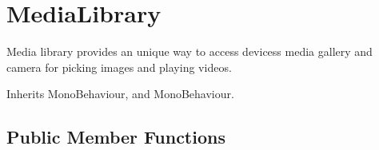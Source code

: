 \hypertarget{class_voxel_busters_1_1_native_plugins_1_1_media_library}{}\section{Media\+Library}
\label{class_voxel_busters_1_1_native_plugins_1_1_media_library}


Media library provides an unique way to access devices\textquotesingle{}s media gallery and camera for picking images and playing videos.  




Inherits Mono\+Behaviour, and Mono\+Behaviour.

\subsection*{Public Member Functions}
